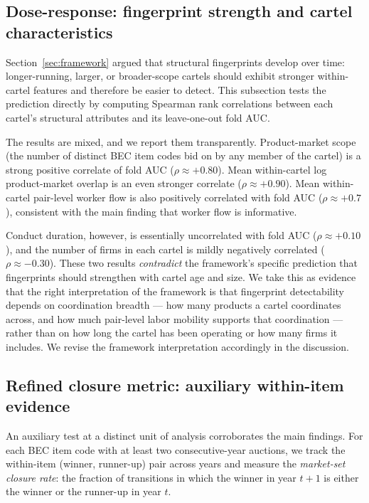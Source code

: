 \subsection{Dose-response: fingerprint strength and cartel characteristics}\label{sec:rob_dose}

Section~\ref{sec:framework} argued that structural fingerprints develop over time: longer-running, larger, or broader-scope cartels should exhibit stronger within-cartel features and therefore be easier to detect. This subsection tests the prediction directly by computing Spearman rank correlations between each cartel's structural attributes and its leave-one-out fold AUC.

The results are mixed, and we report them transparently. Product-market scope (the number of distinct BEC item codes bid on by any member of the cartel) is a strong positive correlate of fold AUC ($\rho \approx +0.80$). Mean within-cartel log product-market overlap is an even stronger correlate ($\rho \approx +0.90$). Mean within-cartel pair-level worker flow is also positively correlated with fold AUC ($\rho \approx +0.7$), consistent with the main finding that worker flow is informative.

Conduct duration, however, is essentially uncorrelated with fold AUC ($\rho \approx +0.10$), and the number of firms in each cartel is mildly negatively correlated ($\rho \approx -0.30$). These two results \emph{contradict} the framework's specific prediction that fingerprints should strengthen with cartel age and size. We take this as evidence that the right interpretation of the framework is that fingerprint detectability depends on coordination breadth --- how many products a cartel coordinates across, and how much pair-level labor mobility supports that coordination --- rather than on how long the cartel has been operating or how many firms it includes. We revise the framework interpretation accordingly in the discussion.

\subsection{Refined closure metric: auxiliary within-item evidence}\label{sec:rob_closure}

An auxiliary test at a distinct unit of analysis corroborates the main findings. For each BEC item code with at least two consecutive-year auctions, we track the within-item (winner, runner-up) pair across years and measure the \emph{market-set closure rate}: the fraction of transitions in which the winner in year $t+1$ is either the winner or the runner-up in year $t$.

